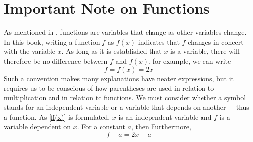 




\section*{Important Note on Functions}
As mentioned in \mb, functions are variables that change as other variables change. In this book, writing a function $ f $ as $ f(x) $ indicates that $ f $ changes in concert with the variable $ x $. As long as it is established that $ x $ is a variable, there will therefore be no difference between $ f $ and $ f(x)$, for example, we can write
\begin{equation}\label{ff(x)}
	f=f(x)=2x	
\end{equation} 
Such a convention makes many explanations have neater expressions, but it requires us to be conscious of how parentheses are used in relation to multiplication and in relation to functions. We must consider whether a symbol stands for an independent variable or a variable that depends on another $ - $ thus a function. As \eqref{ff(x)} is formulated, $ x $ is an independent variable and $ f $ is a variable dependent on $ x $. For a constant $ a $, then
Furthermore,
\[ f-a=2x-a \]

